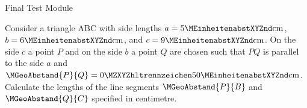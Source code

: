 \begin{MTest}{Final Test Module }
\begin{MExercise} %
Consider a triangle ABC with side lengths
$a = 5\MEinheit{cm}$,
$b = 6\MEinheit{cm}$, and
$c = 9\MEinheit{cm}$. On the side $c$ a point $P$ and on the side $b$ a point $Q$ 
are chosen such that $PQ$ is parallel to the side $a$ and 
$\MGeoAbstand{P}{Q} = \MZahl{0}{50}\MEinheit{cm}$. Calculate the lengths 
of the line segments $\MGeoAbstand{P}{B}$ and $\MGeoAbstand{Q}{C}$ specified in centimetre.
\par
\begin{MExerciseItems}
\item {}
\item {}
\end{MExerciseItems}
\end{MExercise}



\end{MTest}
